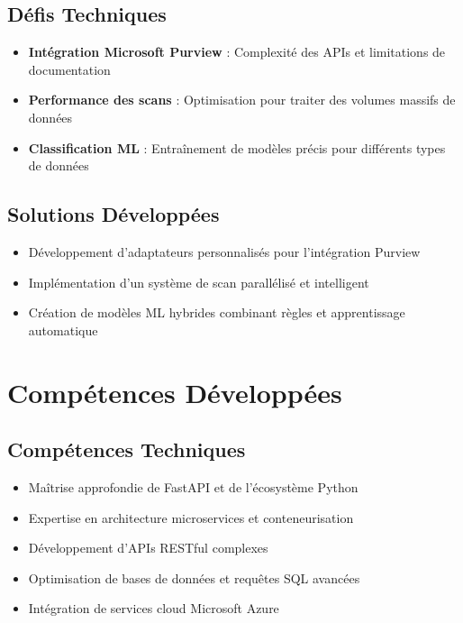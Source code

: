 \documentclass[12pt,a4paper]{article}
\begin{document}
\subsection{Défis Techniques}

\begin{itemize}
    \item \textbf{Intégration Microsoft Purview} : Complexité des APIs et limitations de documentation
    \item \textbf{Performance des scans} : Optimisation pour traiter des volumes massifs de données
    \item \textbf{Classification ML} : Entraînement de modèles précis pour différents types de données
\end{itemize}

\subsection{Solutions Développées}

\begin{itemize}
    \item Développement d'adaptateurs personnalisés pour l'intégration Purview
    \item Implémentation d'un système de scan parallélisé et intelligent
    \item Création de modèles ML hybrides combinant règles et apprentissage automatique
\end{itemize}

\section{Compétences Développées}

\subsection{Compétences Techniques}

\begin{itemize}
    \item Maîtrise approfondie de FastAPI et de l'écosystème Python
    \item Expertise en architecture microservices et conteneurisation
    \item Développement d'APIs RESTful complexes
    \item Optimisation de bases de données et requêtes SQL avancées
    \item Intégration de services cloud Microsoft Azure
\end{itemize}
\end{document}
